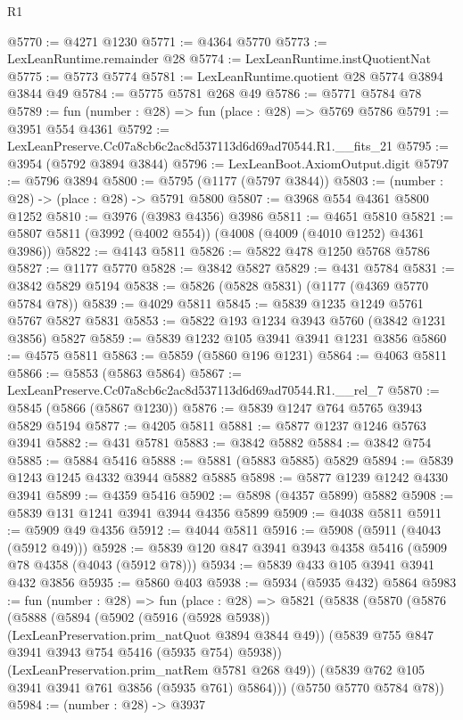\begin{lexlean}{R1}
\begin{coremodule}
@5770 := @4271 @1230
@5771 := @4364 @5770
@5773 := LexLeanRuntime.remainder @28
@5774 := LexLeanRuntime.instQuotientNat
@5775 := @5773 @5774
@5781 := LexLeanRuntime.quotient @28 @5774 @3894 @3844 @49
@5784 := @5775 @5781 @268 @49
@5786 := @5771 @5784 @78
@5789 := fun (number : @28) => fun (place : @28) => @5769 @5786
@5791 := @3951 @554 @4361
@5792 := LexLeanPreserve.Cc07a8cb6c2ac8d537113d6d69ad70544.R1.__fits_21
@5795 := @3954 (@5792 @3894 @3844)
@5796 := LexLeanBoot.AxiomOutput.digit
@5797 := @5796 @3894
@5800 := @5795 (@1177 (@5797 @3844))
@5803 := (number : @28) -> (place : @28) -> @5791 @5800
@5807 := @3968 @554 @4361 @5800 @1252
@5810 := @3976 (@3983 @4356) @3986
@5811 := @4651 @5810
@5821 := @5807 @5811 (@3992 (@4002 @554)) (@4008 (@4009 (@4010 @1252) @4361 @3986))
@5822 := @4143 @5811
@5826 := @5822 @478 @1250 @5768 @5786
@5827 := @1177 @5770
@5828 := @3842 @5827
@5829 := @431 @5784
@5831 := @3842 @5829 @5194
@5838 := @5826 (@5828 @5831) (@1177 (@4369 @5770 @5784 @78))
@5839 := @4029 @5811
@5845 := @5839 @1235 @1249 @5761 @5767 @5827 @5831
@5853 := @5822 @193 @1234 @3943 @5760 (@3842 @1231 @3856) @5827
@5859 := @5839 @1232 @105 @3941 @3941 @1231 @3856
@5860 := @4575 @5811
@5863 := @5859 (@5860 @196 @1231)
@5864 := @4063 @5811
@5866 := @5853 (@5863 @5864)
@5867 := LexLeanPreserve.Cc07a8cb6c2ac8d537113d6d69ad70544.R1.__rel_7
@5870 := @5845 (@5866 (@5867 @1230))
@5876 := @5839 @1247 @764 @5765 @3943 @5829 @5194
@5877 := @4205 @5811
@5881 := @5877 @1237 @1246 @5763 @3941
@5882 := @431 @5781
@5883 := @3842 @5882
@5884 := @3842 @754
@5885 := @5884 @5416
@5888 := @5881 (@5883 @5885) @5829
@5894 := @5839 @1243 @1245 @4332 @3944 @5882 @5885
@5898 := @5877 @1239 @1242 @4330 @3941
@5899 := @4359 @5416
@5902 := @5898 (@4357 @5899) @5882
@5908 := @5839 @131 @1241 @3941 @3944 @4356 @5899
@5909 := @4038 @5811
@5911 := @5909 @49 @4356
@5912 := @4044 @5811
@5916 := @5908 (@5911 (@4043 (@5912 @49)))
@5928 := @5839 @120 @847 @3941 @3943 @4358 @5416 (@5909 @78 @4358 (@4043 (@5912 @78)))
@5934 := @5839 @433 @105 @3941 @3941 @432 @3856
@5935 := @5860 @403
@5938 := @5934 (@5935 @432) @5864
@5983 := fun (number : @28) =>
  fun (place : @28) =>
  @5821
    (@5838
      (@5870
        (@5876
          (@5888
            (@5894
              (@5902 (@5916 (@5928 @5938)) (LexLeanPreservation.prim_natQuot @3894 @3844 @49))
              (@5839 @755 @847 @3941 @3943 @754 @5416 (@5935 @754) @5938))
            (LexLeanPreservation.prim_natRem @5781 @268 @49))
          (@5839 @762 @105 @3941 @3941 @761 @3856 (@5935 @761) @5864)))
      (@5750 @5770 @5784 @78))
@5984 := (number : @28) -> @3937

\end{coremodule}
\end{lexlean}
